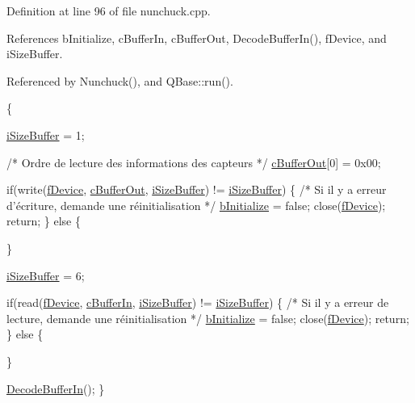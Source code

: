 Definition at line 96 of file nunchuck.\-cpp.



References b\-Initialize, c\-Buffer\-In, c\-Buffer\-Out, Decode\-Buffer\-In(), f\-Device, and i\-Size\-Buffer.



Referenced by Nunchuck(), and Q\-Base\-::run().


\begin{DoxyCode}
                           \{

    \hyperlink{classNunchuck_a671e2732508cdd56e51898b79e58d455}{iSizeBuffer} = 1;

    \textcolor{comment}{/*  Ordre de lecture des informations des capteurs   */}
    \hyperlink{classNunchuck_a4f2eea10fb4eba245c24168ce00429f8}{cBufferOut}[0] = 0x00;

    \textcolor{keywordflow}{if}(write(\hyperlink{classNunchuck_a61f4874769103ba04e13f75a08442f8e}{fDevice}, \hyperlink{classNunchuck_a4f2eea10fb4eba245c24168ce00429f8}{cBufferOut}, \hyperlink{classNunchuck_a671e2732508cdd56e51898b79e58d455}{iSizeBuffer}) != 
      \hyperlink{classNunchuck_a671e2732508cdd56e51898b79e58d455}{iSizeBuffer}) \{
    \textcolor{comment}{/*   Si il y a erreur d'écriture, demande une réinitialisation   */}
       \hyperlink{classNunchuck_a3ecbcb3a01a247605b4f0a37b579581d}{bInitialize} = \textcolor{keyword}{false};
       close(\hyperlink{classNunchuck_a61f4874769103ba04e13f75a08442f8e}{fDevice});
       \textcolor{keywordflow}{return};
    \}
    \textcolor{keywordflow}{else} \{

    \}

    \hyperlink{classNunchuck_a671e2732508cdd56e51898b79e58d455}{iSizeBuffer} = 6;

    \textcolor{keywordflow}{if}(read(\hyperlink{classNunchuck_a61f4874769103ba04e13f75a08442f8e}{fDevice}, \hyperlink{classNunchuck_a1bd7122f88582d12ab2ac5d3c8c7b8f8}{cBufferIn}, \hyperlink{classNunchuck_a671e2732508cdd56e51898b79e58d455}{iSizeBuffer}) != 
      \hyperlink{classNunchuck_a671e2732508cdd56e51898b79e58d455}{iSizeBuffer}) \{
    \textcolor{comment}{/*   Si il y a erreur de lecture, demande une réinitialisation   */}
       \hyperlink{classNunchuck_a3ecbcb3a01a247605b4f0a37b579581d}{bInitialize} = \textcolor{keyword}{false};
       close(\hyperlink{classNunchuck_a61f4874769103ba04e13f75a08442f8e}{fDevice});
       \textcolor{keywordflow}{return};
    \}
    \textcolor{keywordflow}{else} \{

    \}

    \hyperlink{classNunchuck_aac4e5f6da04ee3fb6beada59aefd1612}{DecodeBufferIn}();
\}
\end{DoxyCode}


